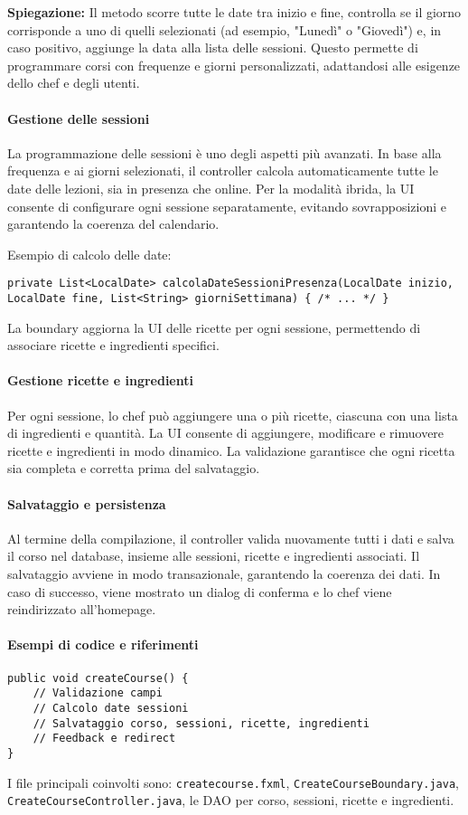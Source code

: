 \textbf{Spiegazione:} Il metodo scorre tutte le date tra inizio e fine, controlla se il giorno corrisponde a uno di quelli selezionati (ad esempio, "Lunedì" o "Giovedì") e, in caso positivo, aggiunge la data alla lista delle sessioni. Questo permette di programmare corsi con frequenze e giorni personalizzati, adattandosi alle esigenze dello chef e degli utenti.

\paragraph{Gestione delle sessioni}
La programmazione delle sessioni è uno degli aspetti più avanzati. In base alla frequenza e ai giorni selezionati, il controller calcola automaticamente tutte le date delle lezioni, sia in presenza che online. Per la modalità ibrida, la UI consente di configurare ogni sessione separatamente, evitando sovrapposizioni e garantendo la coerenza del calendario.

Esempio di calcolo delle date:
\begin{verbatim}
private List<LocalDate> calcolaDateSessioniPresenza(LocalDate inizio, LocalDate fine, List<String> giorniSettimana) { /* ... */ }
\end{verbatim}
La boundary aggiorna la UI delle ricette per ogni sessione, permettendo di associare ricette e ingredienti specifici.

\paragraph{Gestione ricette e ingredienti}
Per ogni sessione, lo chef può aggiungere una o più ricette, ciascuna con una lista di ingredienti e quantità. La UI consente di aggiungere, modificare e rimuovere ricette e ingredienti in modo dinamico. La validazione garantisce che ogni ricetta sia completa e corretta prima del salvataggio.

\paragraph{Salvataggio e persistenza}
Al termine della compilazione, il controller valida nuovamente tutti i dati e salva il corso nel database, insieme alle sessioni, ricette e ingredienti associati. Il salvataggio avviene in modo transazionale, garantendo la coerenza dei dati. In caso di successo, viene mostrato un dialog di conferma e lo chef viene reindirizzato all'homepage.

\paragraph{Esempi di codice e riferimenti}
\begin{verbatim}
public void createCourse() {
    // Validazione campi
    // Calcolo date sessioni
    // Salvataggio corso, sessioni, ricette, ingredienti
    // Feedback e redirect
}
\end{verbatim}
I file principali coinvolti sono: \texttt{createcourse.fxml}, \texttt{CreateCourseBoundary.java}, \texttt{CreateCourseController.java}, le DAO per corso, sessioni, ricette e ingredienti.


